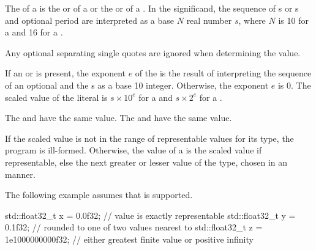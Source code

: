 \pnum
{}%
The  of a 
is the  or 
of a 
or the 
or 
of a .
In the significand,
the sequence of s or s
and optional period are interpreted as a base $N$ real number $s$,
where $N$ is 10 for a  and
16 for a .
\begin{note}
Any optional separating single quotes are ignored when determining the value.
\end{note}
If an  or 
is present,
the exponent $e$ of the 
is the result of interpreting
the sequence of an optional  and the s
as a base 10 integer.
Otherwise, the exponent $e$ is 0.
The scaled value of the literal is
$s \times 10^e$ for a  and
$s \times 2^e$ for a .
\begin{example}
The 
 and  have the same value.
The 
 and 
have the same value.
\end{example}

\pnum
If the scaled value is not in the range of representable
values for its type, the program is ill-formed.
Otherwise, the value of a 
is the scaled value if representable,
else the next greater or lesser value of the type,
chosen in an  manner.
\begin{example}
The following example assumes that
 is supported.
\begin{codeblock}
std::float32_t x = 0.0f32;          // value  is exactly representable
std::float32_t y = 0.1f32;          // rounded to one of two values nearest to 
std::float32_t z = 1e1000000000f32; // either greatest finite value or positive infinity
\end{codeblock}
\end{example}

